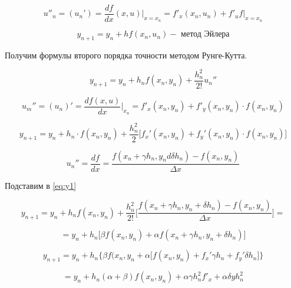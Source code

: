 \begin{equation*}
    u''_n = (u_n') = \frac{df}{dx} (x, u) \bigg|_{x=x_n} =
    f'_x (x_n, u_n) + f'_uf \bigg|_{x=x_n}
\end{equation*}

\begin{equation*}
    y_{n+1} = y_n + hf(x_n, u_n) - \text{ метод Эйлера}
\end{equation*}

Получим формулы второго порядка точности методом Рунге-Кутта.

\begin{equation}\label{eq:y1}
    y_{n+1} = y_n + h_n f(x_n,y_n) + \frac{h_n^2}{2!} u_n''
\end{equation}

\begin{equation*}
    u_m'' = (u_n)' = \frac{df(x,u)}{dx} \bigg|_{x_n} = f'_x(x_n, y_n) +
    f'_y(x_n, y_n) \cdot f(x_n, y_n)
\end{equation*}

\begin{equation}\label{eq:y2}
    y_{n+1} = y_n + h_n \cdot f(x_n, y_n) + \frac{h_n^2}{2}
    \bigg[ f_x'(x_n, y_n) + f_y'(x_n, y_n) \cdot f(x_n, y_n) \bigg]
\end{equation}

\begin{equation*}
    u_n'' = \frac{df}{dx} =
    \frac{f(x_n + \gamma h_n, y_n d \delta h_n) - f(x_n, y_n)}{\Delta x}
\end{equation*}

Подставим в \ref{eq:y1}

\begin{equation*}
    y_{n+1} = y_n + h_n f(x_n, y_n) + \frac{h_n^2}{2!}
    \bigg[
    \frac{f(x_n + \gamma h_n, y_n + \delta h_n) - f(x_n, y_n)}{\Delta x}
    \bigg] =
\end{equation*}

\begin{equation}\label{eq:y3}
    = y_n + h_n \bigg[ \beta f(x_n, y_n) + \alpha f(x_n + \gamma h_n, y_n + \delta h_n) \bigg]
\end{equation}

\begin{equation*}
    y_{n+1} = y_n + h_n \bigg\{ \beta f(x_n, y_n + \alpha \big[
    f(x_n, y_n) + f_x' \gamma h_n + f_y' \delta h_n \big] \bigg\}
\end{equation*}

\begin{equation}\label{eq:y4}
    = y_n + h_n (\alpha + \beta) f(x_n, y_n) + \alpha \gamma h_n^2 f'_x
    + \alpha \delta y h_n^2
\end{equation}

